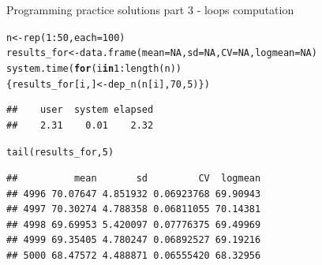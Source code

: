 \documentclass[xcolor=table,           xcolor=dvipsnames]{beamer}\usepackage[]{graphicx}\usepackage[]{color}
\makeatletter
\newcommand{\hlnum}[1]{\textcolor[rgb]{0,0,0}{#1}}
\newcommand{\hlopt}[1]{\textcolor[rgb]{0,0,0}{#1}}
\newcommand{\hlstd}[1]{\textcolor[rgb]{0,0,0}{#1}}
\newcommand{\hlkwa}[1]{\textcolor[rgb]{1,0,0}{\textbf{#1}}}
\newcommand{\hlkwb}[1]{\textcolor[rgb]{0,0,0}{#1}}
\newcommand{\hlkwc}[1]{\textcolor[rgb]{1,0,1}{#1}}
\newcommand{\hlkwd}[1]{\textcolor[rgb]{0,0,1}{#1}}
\newenvironment{kframe}{%
 \def\at@end@of@kframe{}%
 \ifinner\ifhmode%
  \def\at@end@of@kframe{\end{minipage}}%
  \begin{minipage}{\columnwidth}%
 \fi\fi%
 \def\FrameCommand##1{\hskip\@totalleftmargin \hskip-\fboxsep
 \colorbox{shadecolor}{##1}\hskip-\fboxsep
     \hskip-\linewidth \hskip-\@totalleftmargin \hskip\columnwidth}%
 \MakeFramed {\advance\hsize-\width
   \@totalleftmargin\z@ \linewidth\hsize
   \@setminipage}}%
 {\par\unskip\endMakeFramed%
 \at@end@of@kframe}
\newenvironment{knitrout}{}{} %
\makeatother
\begin{document}

\begin{frame}[fragile]{Programming practice solutions part 3 - loops computation}
\begin{knitrout}
\color{fgcolor}\begin{kframe}
\begin{alltt}
\hlstd{n} \hlkwb{<-} \hlkwd{rep}\hlstd{(}\hlnum{1}\hlopt{:}\hlnum{50}\hlstd{,} \hlkwc{each}\hlstd{=}\hlnum{100}\hlstd{)}
\hlstd{results_for} \hlkwb{<-} \hlkwd{data.frame}\hlstd{(}\hlkwc{mean}\hlstd{=}\hlnum{NA}\hlstd{,} \hlkwc{sd}\hlstd{=}\hlnum{NA}\hlstd{,} \hlkwc{CV}\hlstd{=}\hlnum{NA}\hlstd{,} \hlkwc{logmean}\hlstd{=}\hlnum{NA}\hlstd{)}
\hlkwd{system.time}\hlstd{(} \hlkwa{for}\hlstd{(i} \hlkwa{in} \hlnum{1}\hlopt{:}\hlkwd{length}\hlstd{(n))}
  \hlstd{\{results_for[i, ]} \hlkwb{<-} \hlkwd{dep_n}\hlstd{(n[i],} \hlnum{70}\hlstd{,}\hlnum{5}\hlstd{)\})}
\end{alltt}
\begin{verbatim}
##    user  system elapsed 
##    2.31    0.01    2.32
\end{verbatim}
\begin{alltt}
\hlkwd{tail}\hlstd{(results_for,} \hlnum{5}\hlstd{)}
\end{alltt}
\begin{verbatim}
##          mean       sd         CV  logmean
## 4996 70.07647 4.851932 0.06923768 69.90943
## 4997 70.30274 4.788358 0.06811055 70.14381
## 4998 69.69953 5.420097 0.07776375 69.49969
## 4999 69.35405 4.780247 0.06892527 69.19216
## 5000 68.47572 4.488871 0.06555420 68.32956
\end{verbatim}
\end{kframe}
\end{knitrout}

\end{frame}

\end{document}
